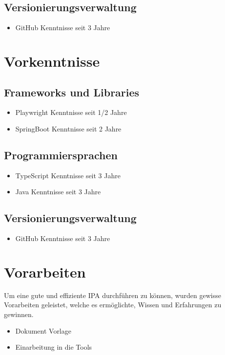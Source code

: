 \subsection{Versionierungsverwaltung}
\begin{itemize}
    \item GitHub \hfill Kenntnisse seit 3 Jahre
\end{itemize}

\section{Vorkenntnisse}
\subsection{Frameworks und Libraries}
\begin{itemize}
    \item Playwright \hfill Kenntnisse seit 1/2 Jahre
    \item SpringBoot \hfill Kenntnisse seit 2 Jahre
\end{itemize}

\subsection{Programmiersprachen}
\begin{itemize}
    \item TypeScript \hfill Kenntnisse seit 3 Jahre
    \item Java \hfill Kenntnisse seit 3 Jahre
\end{itemize}

\subsection{Versionierungsverwaltung}
\begin{itemize}
    \item GitHub \hfill Kenntnisse seit 3 Jahre
\end{itemize}

\section{Vorarbeiten}
Um eine gute und effiziente IPA durchführen zu können, wurden gewisse Vorarbeiten geleistet,
welche es ermöglichte, Wissen und Erfahrungen zu gewinnen.
\begin{itemize}
    \item Dokument Vorlage
    \item Einarbeitung in die Tools
\end{itemize}

